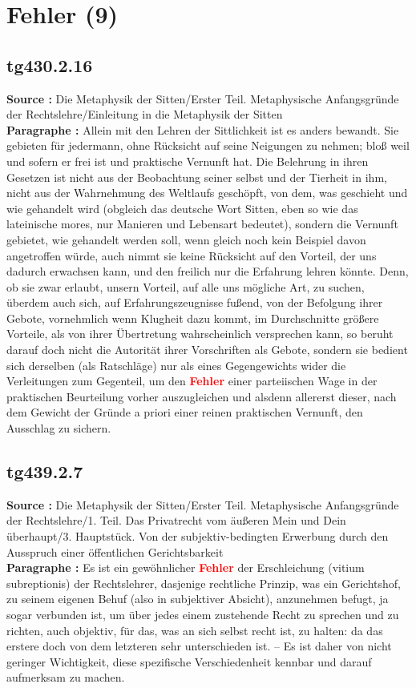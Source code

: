 \documentclass[a4paper,12pt,twoside]{book}
\newcommand{\match}[1]{\textcolor{red}{\textbf{#1}}}
\newcommand{\unnumberedsection}[1]{
	\section*{#1}
	\addcontentsline{toc}{section}{#1}
	\markright{#1}
}
\begin{document}
	\unnumberedsection{Fehler (9)} 
	\subsection*{tg430.2.16} 
	\textbf{Source : }Die Metaphysik der Sitten/Erster Teil. Metaphysische Anfangsgründe der Rechtslehre/Einleitung in die Metaphysik der Sitten\\  
	
	\textbf{Paragraphe : }Allein mit den Lehren der Sittlichkeit ist es anders bewandt. Sie gebieten für jedermann, ohne Rücksicht auf seine Neigungen zu nehmen; bloß weil und sofern er frei ist und praktische Vernunft hat. Die Belehrung in ihren Gesetzen ist nicht aus der Beobachtung seiner selbst und der Tierheit in ihm, nicht aus der Wahrnehmung des Weltlaufs geschöpft,  von dem, was geschieht und wie gehandelt wird (obgleich das deutsche Wort Sitten, eben so wie das lateinische mores, nur Manieren und Lebensart bedeutet), sondern die Vernunft gebietet, wie gehandelt werden soll, wenn gleich noch kein Beispiel davon angetroffen würde, auch nimmt sie keine Rücksicht auf den Vorteil, der uns dadurch erwachsen kann, und den freilich nur die Erfahrung lehren könnte. Denn, ob sie zwar erlaubt, unsern Vorteil, auf alle uns mögliche Art, zu suchen, überdem auch sich, auf Erfahrungszeugnisse fußend, von der Befolgung ihrer Gebote, vornehmlich wenn Klugheit dazu kommt, im Durchschnitte größere Vorteile, als von ihrer Übertretung wahrscheinlich versprechen kann, so beruht darauf doch nicht die Autorität ihrer Vorschriften als Gebote, sondern sie bedient sich derselben (als Ratschläge) nur als eines Gegengewichts wider die Verleitungen zum Gegenteil, um den \match{Fehler} einer parteiischen Wage in der praktischen Beurteilung vorher auszugleichen und alsdenn allererst dieser, nach dem Gewicht der Gründe a priori einer reinen praktischen Vernunft, den Ausschlag zu sichern. 
	
	\subsection*{tg439.2.7} 
	\textbf{Source : }Die Metaphysik der Sitten/Erster Teil. Metaphysische Anfangsgründe der Rechtslehre/1. Teil. Das Privatrecht vom äußeren Mein und Dein überhaupt/3. Hauptstück. Von der subjektiv-bedingten Erwerbung durch den Ausspruch einer öffentlichen Gerichtsbarkeit\\  
	
	\textbf{Paragraphe : }Es ist ein gewöhnlicher \match{Fehler} der Erschleichung (vitium subreptionis) der Rechtslehrer, dasjenige rechtliche Prinzip, was ein Gerichtshof, zu seinem eigenen Behuf (also in subjektiver Absicht), anzunehmen befugt, ja sogar verbunden ist, um über jedes einem zustehende Recht zu sprechen und zu richten, auch objektiv, für das, was an sich selbst recht ist, zu halten: da das erstere doch von dem letzteren sehr unterschieden ist. – Es ist daher von nicht geringer Wichtigkeit, diese spezifische Verschiedenheit kennbar und darauf aufmerksam zu machen. 
	
\end{document}
